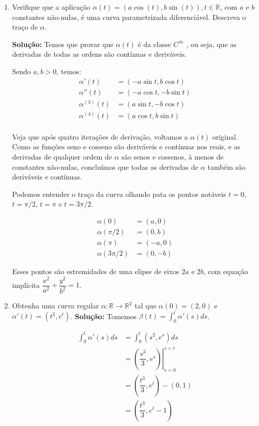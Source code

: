 \documentclass[12pt,letterpaper]{article}
\begin{document}
\begin{enumerate}
	\item Verifique que a aplicação $\alpha(t) = (a \cos(t), b\sin(t)), t \in \mathbb{R}$, com $a$ e $b$ constantes não-nulas, é uma curva parametrizada diferenciável. Descreva o traço de $\alpha$.
	
	\subitem \textbf{Solução:} Temos que provar que $\alpha(t)$ é da classe $C^{\infty}$ \cite{ronaldo}, ou seja, que as derivadas de todas as ordens são contínuas e deriváveis.
	
	Sendo $a,b>0$, temos:
	\begin{align*}
		\alpha'(t)&=(-a\sin t,b \cos t)\\
		\alpha''(t)&=(-a\cos t,-b\sin t)\\
		\alpha^{(3)}(t)&=(a\sin t,-b\cos t)\\
		\alpha^{(4)}(t)&=(a\cos t,b\sin t)\\
	\end{align*}
	
	Veja que após quatro iterações de derivação, voltamos a $\alpha(t)$ original. Como as funções seno e cosseno são deriváveis e contínuas nos reais, e as derivadas de qualquer ordem de $\alpha$ são senos e cossenos, à menos de constantes não-nulas, concluímos que todas as derivadas de $\alpha$ também são deriváveis e contínuas.
	
	Podemos entender o traço da curva olhando pata os pontos notáveis $t=0$, $t=\pi/2$, $t=\pi$ e $t=3\pi/2$.
	
	\begin{align*}
	\alpha(0)&=(a,0)\\
	\alpha(\pi/2)&=(0,b)\\
	\alpha(\pi)&=(-a,0)\\
	\alpha(3\pi/2)&=(0,-b)
	\end{align*}
	
	Esses pontos são estremidades de uma elipse de eixos $2a$ e $2b$, com equação implícita $\dfrac{x^2}{a^2}+\dfrac{y^2}{b^2}=1$.
	\item Obtenha uma curva regular $\alpha: \mathbb{R}\to\mathbb{R}^2$ tal que $\alpha(0) = (2, 0)$ e $\alpha' (t) = (t^2 , e^t)$.
	\subitem \textbf{Solução:}
	Tomemos  $\beta(t)=\displaystyle\int_0^t\alpha'(s)ds$.
	
	\begin{align*}
	\displaystyle\int_0^t\alpha'(s)ds&=\int_0^t(s^2 , e^s)ds\\&=\left.\left(\dfrac{s^3}3,e^s\right)\right|_{s=0}^{s=t}\\
	&=\left(\dfrac{t^3}3,e^t\right)-\left(0,1\right)\\
	&=\left(\dfrac{t^3}3,e^t-1\right)
	\end{align*}
	

\end{enumerate}
\end{document}
